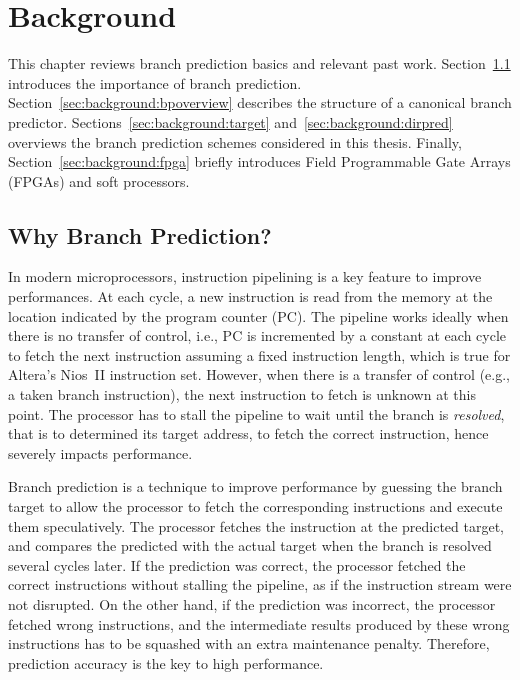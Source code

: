 \chapter{Background}
\label{chap:background}
This chapter reviews branch prediction basics and relevant past work. Section~\ref{sec:background:whybp} introduces the importance of branch prediction. Section~\ref{sec:background:bpoverview} describes the structure of a canonical branch predictor. Sections~\ref{sec:background:target} and~\ref{sec:background:dirpred} overviews the branch prediction schemes considered in this thesis. Finally, Section~\ref{sec:background:fpga} briefly introduces Field Programmable Gate Arrays (FPGAs) and soft processors.

\section{Why Branch Prediction?}
\label{sec:background:whybp}
In modern microprocessors, instruction pipelining is a key feature to improve performances. At each cycle, a new instruction is read from the memory at the location indicated by the program counter (PC). The pipeline works ideally when there is no transfer of control, i.e., PC is incremented by a constant at each cycle to fetch the next instruction assuming a fixed instruction length, which is true for Altera's Nios~II instruction set. However, when there is a transfer of control (e.g., a taken branch instruction), the next instruction to fetch is unknown at this point. The processor has to stall the pipeline to wait until the branch is \textit{resolved}, that is to determined its target address, to fetch the correct instruction, hence severely impacts performance.

Branch prediction is a technique to improve performance by guessing the branch target  to allow the processor to fetch the corresponding instructions and execute them speculatively. The processor fetches the instruction at the predicted target, and compares the predicted with the actual target when the branch is resolved several cycles later. If the prediction was correct, the processor fetched the correct instructions without stalling the pipeline, as if the instruction stream were not disrupted. On the other hand, if the prediction was incorrect, the processor fetched wrong instructions, and the intermediate results produced by these wrong instructions has to be squashed with an extra maintenance penalty. Therefore, prediction accuracy is the key to high performance.

